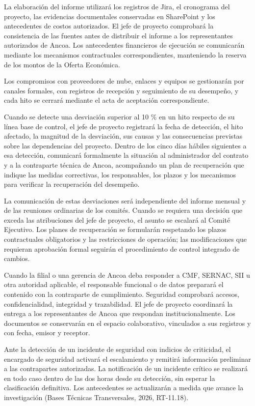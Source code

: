 \documentclass[11pt]{article}
\begin{document}
La elaboración del informe utilizará los registros de Jira, el
cronograma del proyecto, las evidencias documentales conservadas en
SharePoint y los antecedentes de costos autorizados. El jefe de proyecto
comprobará la consistencia de las fuentes antes de distribuir el informe
a los representantes autorizados de Ancoa. Los antecedentes financieros
de ejecución se comunicarán mediante los mecanismos contractuales
correspondientes, manteniendo la reserva de los montos de la Oferta
Económica.

Los compromisos con proveedores de nube, enlaces y equipos se
gestionarán por canales formales, con registros de recepción y
seguimiento de su desempeño, y cada hito se cerrará mediante el acta de
aceptación correspondiente.

Cuando se detecte una desviación superior al 10 \% en un hito respecto
de su línea base de control, el jefe de proyecto registrará la fecha de
detección, el hito afectado, la magnitud de la desviación, sus causas y
las consecuencias previstas sobre las dependencias del proyecto. Dentro
de los cinco días hábiles siguientes a esa detección, comunicará
formalmente la situación al administrador del contrato y a la
contraparte técnica de Ancoa, acompañando un plan de recuperación que
indique las medidas correctivas, los responsables, los plazos y los
mecanismos para verificar la recuperación del desempeño.

La comunicación de estas desviaciones será independiente del informe
mensual y de las reuniones ordinarias de los comités. Cuando se requiera
una decisión que exceda las atribuciones del jefe de proyecto, el asunto
se escalará al Comité Ejecutivo. Los planes de recuperación se
formularán respetando los plazos contractuales obligatorios y las
restricciones de operación; las modificaciones que requieran aprobación
formal seguirán el procedimiento de control integrado de cambios.

Cuando la filial o una gerencia de Ancoa deba responder a CMF, SERNAC,
SII u otra autoridad aplicable, el responsable funcional o de datos
preparará el contenido con la contraparte de cumplimiento. Seguridad
comprobará accesos, confidencialidad, integridad y trazabilidad. El jefe
de proyecto coordinará la entrega a los representantes de Ancoa que
respondan institucionalmente. Los documentos se conservarán en el
espacio colaborativo, vinculados a sus registros y con fecha, emisor y
receptor.

Ante la detección de un incidente de seguridad con indicios de
criticidad, el encargado de seguridad activará el escalamiento y
remitirá información preliminar a las contrapartes autorizadas. La
notificación de un incidente crítico se realizará en todo caso dentro de
las dos horas desde su detección, sin esperar la clasificación
definitiva. Los antecedentes se actualizarán a medida que avance la
investigación (Bases Técnicas Transversales, 2026, RT-11.18).
\end{document}
